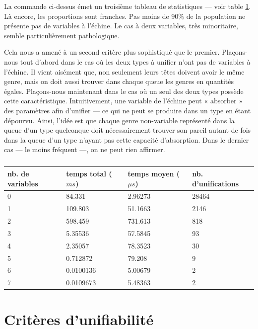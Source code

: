 \documentclass[a4paper]{report}
\theoremstyle{definition}
\begin{document}
La commande ci-dessus émet un troisième tableau de statistiques — voir table \ref{tab_meas_3}. Là encore, les proportions sont franches. Pas moins de 90\% de la population ne présente pas de variables à l'échine. Le cas à deux variables, très minoritaire, semble particulièrement pathologique.

Cela nous a amené à un second critère plus sophistiqué que le premier. Plaçons-nous tout d'abord dans le cas où les deux types à unifier n'ont pas de variables à l'échine. Il vient aisément que, non seulement leurs têtes doivent avoir le même genre, mais on doit aussi trouver dans chaque queue les genres en quantités égales. Plaçons-nous maintenant dans le cas où un seul des deux types possède cette caractéristique. Intuitivement, une variable de l'échine peut « absorber » des paramètres afin d'unifier — ce qui ne peut se produire dans un type en étant dépourvu. Ainsi, l'idée est que chaque genre non-variable représenté dans la queue d'un type quelconque doit nécessairement trouver son pareil autant de fois dans la queue d'un type n'ayant pas cette capacité d'absorption. Dans le dernier cas — le moins fréquent —, on ne peut rien affirmer.

\begin{table}[h]
	\centering
	\begin{tabular}{|l|l|l|l|}
		\hline
			nb. de variables &
			temps total ($ms$) &
			temps moyen ($\mu s$) &
			nb. d'unifications
		\\
		\hline
			0 & 84.331 & 2.96273 & 28464
		\\
			1 & 109.803 & 51.1663 & 2146
		\\
			2 & 598.459 & 731.613 & 818
		\\
			3 & 5.35536 & 57.5845 & 93
		\\
			4 & 2.35057 & 78.3523 & 30
		\\
			5 & 0.712872 & 79.208 & 9
		\\
			6 & 0.0100136 & 5.00679 & 2
		\\
			7 & 0.0109673 & 5.48363 & 2
		\\
		\hline
	\end{tabular}
	\caption{\label{tab_meas_3}}
\end{table}


\section{Critères d'unifiabilité}
\end{document}

